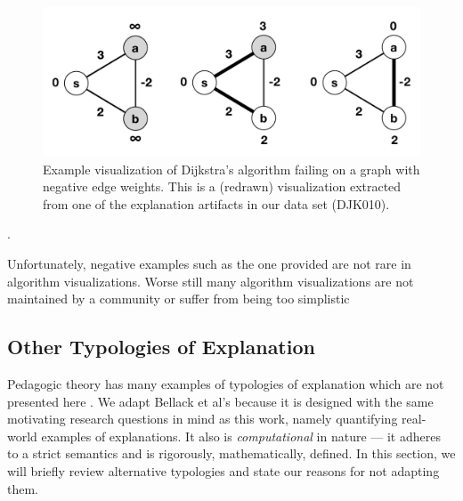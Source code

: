 \documentclass[conference]{IEEEtran}
\begin{document}
\begin{figure}
\centering
\includegraphics[width=0.9\columnwidth]{VisDJK010-Clean}
\caption{Example visualization of Dijkstra's algorithm failing on a graph with
negative edge weights. This is a (redrawn) visualization extracted from one of
the explanation artifacts in our data set (DJK010).}
\label{fig:negative-dijkstra}
\end{figure}


%
\cite{HDS02}.

Unfortunately, negative examples such as the one provided are not rare in
algorithm visualizations. Worse still many algorithm visualizations are not
maintained by a community or suffer from being too
simplistic\cite{shaffer2010algorithm} 

\subsection{Other Typologies of Explanation}
\label{sec:rw:typology}

Pedagogic theory has many examples of typologies of explanation which are not
presented here \cite{Smith1970-SMIASO-13, smith1967language, hyman1968teaching, swift1961explanation} . We adapt Bellack et al's because it is designed with the same
motivating research questions in mind as this work, namely quantifying
real-world examples of explanations. It also is \emph{computational} in nature
--- it adheres to a strict semantics and is rigorously, mathematically, defined.
In this section, we will briefly review alternative typologies and state our
reasons for not adapting them.
\end{document}
